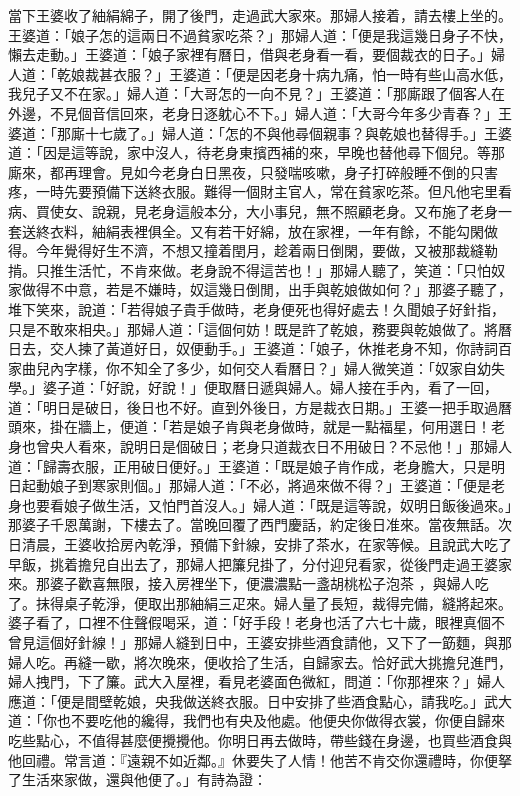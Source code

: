 \begin{showcontents}{}
當下王婆收了紬絹綿子，開了後門，走過武大家來。那婦人接着，請去樓上坐的。王婆道：「娘子怎的這兩日不過貧家吃茶？」那婦人道：「便是我這幾日身子不快，懶去走動。」王婆道：「娘子家裡有曆日，借與老身看一看，要個裁衣的日子。」婦人道：「乾娘裁甚衣服？」王婆道：「便是因老身十病九痛，怕一時有些山高水低，我兒子又不在家。」婦人道：「大哥怎的一向不見？」王婆道：「那廝跟了個客人在外邊，不見個音信回來，老身日逐躭心不下。」婦人道：「大哥今年多少青春？」王婆道：「那廝十七歲了。」婦人道：「怎的不與他尋個親事？與乾娘也替得手。」王婆道：「因是這等說，家中沒人，待老身東擯西補的來，早晚也替他尋下個兒。等那廝來，都再理會。見如今老身白日黑夜，只發喘咳嗽，身子打碎般睡不倒的只害疼，一時先要預備下送終衣服。難得一個財主官人，常在貧家吃茶。但凡他宅里看病、買使女、說親，見老身這般本分，大小事兒，無不照顧老身。又布施了老身一套送終衣料，紬絹表裡俱全。又有若干好綿，放在家裡，一年有餘，不能勾閑做得。今年覺得好生不濟，不想又撞着閏月，趁着兩日倒閑，要做，又被那裁縫勒掯。只推生活忙，不肯來做。老身說不得這苦也！」那婦人聽了，笑道：「只怕奴家做得不中意，若是不嫌時，奴這幾日倒閒，出手與乾娘做如何？」那婆子聽了，堆下笑來，說道：「若得娘子貴手做時，老身便死也得好處去！久聞娘子好針指，只是不敢來相央。」那婦人道：「這個何妨！既是許了乾娘，務要與乾娘做了。將曆日去，交人揀了黃道好日，奴便動手。」王婆道：「娘子，休推老身不知，你詩詞百家曲兒內字樣，你不知全了多少，如何交人看曆日？」婦人微笑道：「奴家自幼失學。」婆子道：「好說，好說！」便取曆日遞與婦人。婦人接在手內，看了一回，道：「明日是破日，後日也不好。直到外後日，方是裁衣日期。」王婆一把手取過曆頭來，掛在牆上，便道：「若是娘子肯與老身做時，就是一點福星，何用選日！老身也曾央人看來，說明日是個破日；老身只道裁衣日不用破日？不忌他！」那婦人道：「歸壽衣服，正用破日便好。」王婆道：「既是娘子肯作成，老身膽大，只是明日起動娘子到寒家則個。」那婦人道：「不必，將過來做不得？」王婆道：「便是老身也要看娘子做生活，又怕門首沒人。」婦人道：「既是這等說，奴明日飯後過來。」那婆子千恩萬謝，下樓去了。當晚回覆了西門慶話，約定後日准來。當夜無話。次日清晨，王婆收拾房內乾淨，預備下針線，安排了茶水，在家等候。且說武大吃了早飯，挑着擔兒自出去了，那婦人把簾兒掛了，分付迎兒看家，從後門走過王婆家來。那婆子歡喜無限，接入房裡坐下，便濃濃點一盞胡桃松子泡茶 ，與婦人吃了。抹得桌子乾淨，便取出那紬絹三疋來。婦人量了長短，裁得完備，縫將起來。婆子看了，口裡不住聲假喝采，道：「好手段！老身也活了六七十歲，眼裡真個不曾見這個好針線！」那婦人縫到日中，王婆安排些酒食請他，又下了一筯麵，與那婦人吃。再縫一歇，將次晚來，便收拾了生活，自歸家去。恰好武大挑擔兒進門，婦人拽門，下了簾。武大入屋裡，看見老婆面色微紅，問道：「你那裡來？」婦人應道：「便是間壁乾娘，央我做送終衣服。日中安排了些酒食點心，請我吃。」武大道：「你也不要吃他的纔得，我們也有央及他處。他便央你做得衣裳，你便自歸來吃些點心，不值得甚麼便攪攪他。你明日再去做時，帶些錢在身邊，也買些酒食與他回禮。常言道：『遠親不如近鄰。』休要失了人情！他苦不肯交你還禮時，你便拏了生活來家做，還與他便了。」有詩為證：


\end{showcontents}
